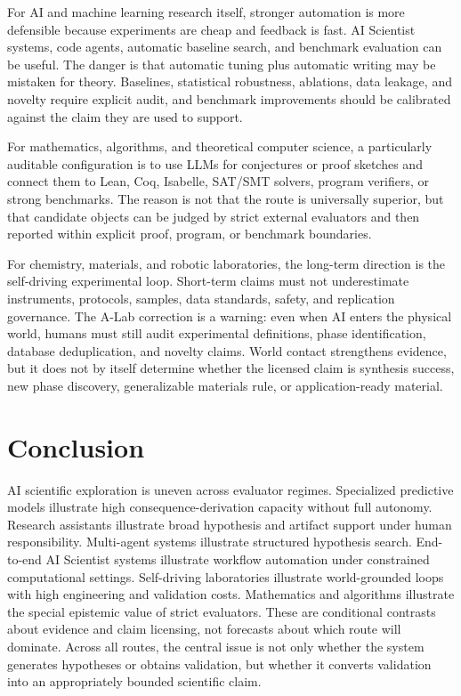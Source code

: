 \documentclass[11pt,a4paper]{article}
\begin{document}
For AI and machine learning research itself, stronger automation is more defensible because experiments are cheap and feedback is fast. AI Scientist systems, code agents, automatic baseline search, and benchmark evaluation can be useful. The danger is that automatic tuning plus automatic writing may be mistaken for theory. Baselines, statistical robustness, ablations, data leakage, and novelty require explicit audit, and benchmark improvements should be calibrated against the claim they are used to support.

For mathematics, algorithms, and theoretical computer science, a particularly auditable configuration is to use LLMs for conjectures or proof sketches and connect them to Lean, Coq, Isabelle, SAT/SMT solvers, program verifiers, or strong benchmarks. The reason is not that the route is universally superior, but that candidate objects can be judged by strict external evaluators and then reported within explicit proof, program, or benchmark boundaries.

For chemistry, materials, and robotic laboratories, the long-term direction is the self-driving experimental loop. Short-term claims must not underestimate instruments, protocols, samples, data standards, safety, and replication governance. The A-Lab correction is a warning: even when AI enters the physical world, humans must still audit experimental definitions, phase identification, database deduplication, and novelty claims. World contact strengthens evidence, but it does not by itself determine whether the licensed claim is synthesis success, new phase discovery, generalizable materials rule, or application-ready material.

\section{Conclusion}

AI scientific exploration is uneven across evaluator regimes. Specialized predictive models illustrate high consequence-derivation capacity without full autonomy. Research assistants illustrate broad hypothesis and artifact support under human responsibility. Multi-agent systems illustrate structured hypothesis search. End-to-end AI Scientist systems illustrate workflow automation under constrained computational settings. Self-driving laboratories illustrate world-grounded loops with high engineering and validation costs. Mathematics and algorithms illustrate the special epistemic value of strict evaluators. These are conditional contrasts about evidence and claim licensing, not forecasts about which route will dominate. Across all routes, the central issue is not only whether the system generates hypotheses or obtains validation, but whether it converts validation into an appropriately bounded scientific claim.
\end{document}
